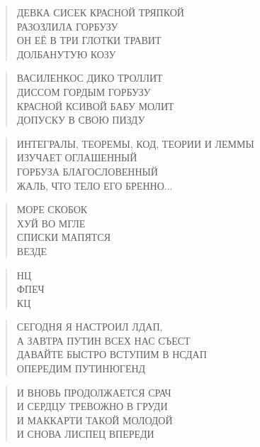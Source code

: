 \poemtitle{***}
\begin{verse}
ДЕВКА СИСЕК КРАСНОЙ ТРЯПКОЙ\\
РАЗОЗЛИЛА ГОРБУЗУ\\
ОН ЕЁ В ТРИ ГЛОТКИ ТРАВИТ\\
ДОЛБАНУТУЮ КОЗУ
\end{verse}

\poemtitle{***}
\begin{verse}
ВАСИЛЕНКОС ДИКО ТРОЛЛИТ\\
ДИССОМ ГОРДЫМ ГОРБУЗУ\\
КРАСНОЙ КСИВОЙ БАБУ МОЛИТ\\
ДОПУСКУ В СВОЮ ПИЗДУ
\end{verse}

\poemtitle{***}
\begin{verse}
ИНТЕГРАЛЫ, ТЕОРЕМЫ, КОД, ТЕОРИИ И ЛЕММЫ\\
ИЗУЧАЕТ ОГЛАШЕННЫЙ\\
ГОРБУЗА БЛАГОСЛОВЕННЫЙ\\
ЖАЛЬ, ЧТО ТЕЛО ЕГО БРЕННО...
\end{verse}

\poemtitle{***}
\begin{verse}
МОРЕ СКОБОК\\
ХУЙ ВО МГЛЕ\\
СПИСКИ МАПЯТСЯ\\
ВЕЗДЕ
\end{verse}

\poemtitle{***}
\begin{verse}
НЦ\\
  ФПЕЧ\\
КЦ
\end{verse}

\poemtitle{***}
\begin{verse}
СЕГОДНЯ Я НАСТРОИЛ ЛДАП, \\
А ЗАВТРА ПУТИН ВСЕХ НАС СЪЕСТ\\
ДАВАЙТЕ БЫСТРО ВСТУПИМ В НСДАП\\
ОПЕРЕДИМ ПУТИНЮГЕНД
\end{verse}

\poemtitle{***}
\begin{verse}
И ВНОВЬ ПРОДОЛЖАЕТСЯ СРАЧ\\
И СЕРДЦУ ТРЕВОЖНО В ГРУДИ\\
И МАККАРТИ ТАКОЙ МОЛОДОЙ\\
И СНОВА ЛИСПЕЦ ВПЕРЕДИ
\end{verse}

